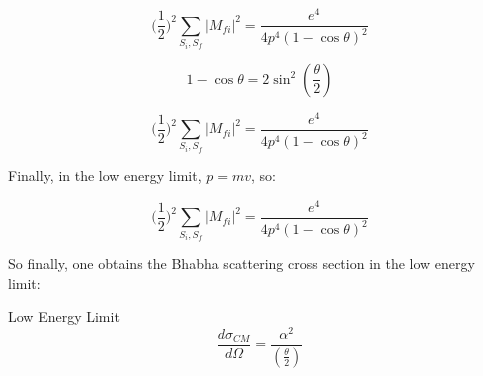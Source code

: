 \documentclass[a4]{article}
\begin{document}
    \begin{equation}
        \Big( \frac{1}{2} \Big)^2 \sum_{S_i, S_f} |M_{f i}|^2 = \frac{e^4}{4 p^4 (1 - \cos \theta)^2}
    \end{equation}

    \begin{equation}
        1 - \cos \theta = 2 \sin^2 (\frac{\theta}{2})
    \end{equation}

    \begin{equation}
        \Big( \frac{1}{2} \Big)^2 \sum_{S_i, S_f} |M_{f i}|^2 = \frac{e^4}{4 p^4 (1 - \cos \theta)^2}
    \end{equation}

    Finally, in the low energy limit, $p = mv$, so:

    \begin{equation}
        \Big( \frac{1}{2} \Big)^2 \sum_{S_i, S_f} |M_{f i}|^2 = \frac{e^4}{4 p^4 (1 - \cos \theta)^2}
    \end{equation}

    So finally, one obtains the Bhabha scattering cross section in the low energy limit:

    \begin{framed}
        Low Energy Limit
        \begin{equation}
            \frac{d \sigma_{CM}}{d \Omega} = \frac{\alpha^2}{(\frac{\theta}{2})}
        \end{equation}
    \end{framed}
\end{document}

